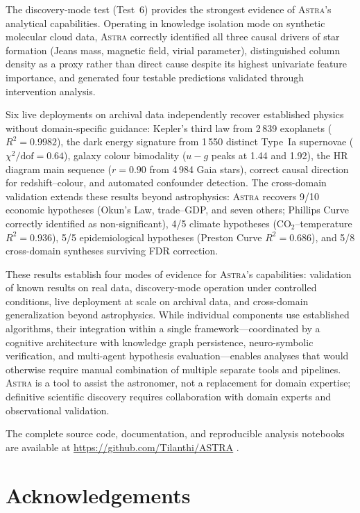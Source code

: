 \documentclass[usenatbib]{rasti}
\newcommand{\astra}{\textsc{Astra}\xspace}
\begin{document}
The discovery-mode test (Test~6) provides the strongest evidence of \astra's analytical capabilities.
Operating in knowledge isolation mode on synthetic molecular cloud data, \astra correctly identified all three causal drivers of star formation (Jeans mass, magnetic field, virial parameter), distinguished column density as a proxy rather than direct cause despite its highest univariate feature importance, and generated four testable predictions validated through intervention analysis.

Six live deployments on archival data independently recover established physics without domain-specific guidance: Kepler's third law from 2\,839 exoplanets ($R^{2}=0.9982$), the dark energy signature from 1\,550 distinct Type~Ia supernovae ($\chi^{2}/\mathrm{dof}=0.64$), galaxy colour bimodality ($u{-}g$ peaks at 1.44 and 1.92), the HR diagram main sequence ($r=0.90$ from 4\,984 Gaia stars), correct causal direction for redshift--colour, and automated confounder detection.
The cross-domain validation extends these results beyond astrophysics: \astra recovers 9/10 economic hypotheses (Okun's Law, trade--GDP, and seven others; Phillips Curve correctly identified as non-significant), 4/5 climate hypotheses (CO$_{2}$--temperature $R^{2}=0.936$), 5/5 epidemiological hypotheses (Preston Curve $R^{2}=0.686$), and 5/8 cross-domain syntheses surviving FDR correction.

These results establish four modes of evidence for \astra's capabilities: validation of known results on real data, discovery-mode operation under controlled conditions, live deployment at scale on archival data, and cross-domain generalization beyond astrophysics.
While individual components use established algorithms, their integration within a single framework---coordinated by a cognitive architecture with knowledge graph persistence, neuro-symbolic verification, and multi-agent hypothesis evaluation---enables analyses that would otherwise require manual combination of multiple separate tools and pipelines.
\astra is a tool to assist the astronomer, not a replacement for domain expertise; definitive scientific discovery requires collaboration with domain experts and observational validation.

The complete source code, documentation, and reproducible analysis notebooks are available at \url{https://github.com/Tilanthi/ASTRA} \citep{White2026}.

\section*{Acknowledgements}
\end{document}
